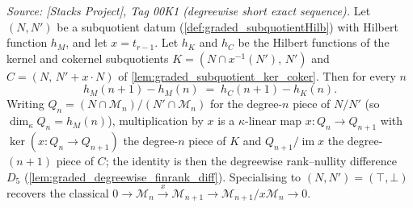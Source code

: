 \begin{lemma}
  \label{lem:graded_subquotient_degreewise_diff}
  \textit{Source: [Stacks Project], Tag 00K1 (degreewise short exact sequence).}
  Let \((N, N')\) be a subquotient datum (\cref{def:graded_subquotientHilb}) with
  Hilbert function \(h_M\), and let \(x = t_{r-1}\). Let \(h_K\) and \(h_C\) be the
  Hilbert functions of the kernel and cokernel subquotients
  \(K = (N \cap x^{-1}(N'),\, N')\) and \(C = (N,\, N' + x \cdot N)\) of
  \cref{lem:graded_subquotient_ker_coker}. Then for every \(n\)
  \[
    h_M(n+1) - h_M(n) \;=\; h_C(n+1) - h_K(n).
  \]
  Writing \(Q_n = (N \cap \mathcal{M}_n)/(N' \cap \mathcal{M}_n)\) for the
  degree-\(n\) piece of \(N/N'\) (so \(\dim_\kappa Q_n = h_M(n)\)), multiplication by
  \(x\) is a \(\kappa\)-linear map \(x : Q_n \to Q_{n+1}\) with
  \(\ker(x : Q_n \to Q_{n+1})\) the degree-\(n\) piece of \(K\) and
  \(Q_{n+1}/\operatorname{im} x\) the degree-\((n+1)\) piece of \(C\); the identity is
  then the degreewise rank--nullity difference \(D_5\)
  (\cref{lem:graded_degreewise_finrank_diff}). Specialising to \((N, N') = (\top,
  \bot)\) recovers the classical \(0 \to \mathcal{M}_n \xrightarrow{x}
  \mathcal{M}_{n+1} \to \mathcal{M}_{n+1}/x\mathcal{M}_n \to 0\).
\end{lemma}

